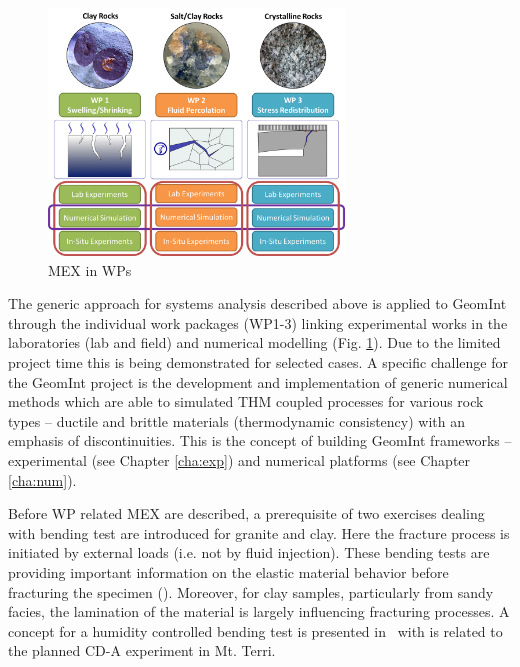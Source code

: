 \begin{figure}
\centering
\includegraphics[width=0.7\textwidth]{figures/geomint-mex-b.png}
\caption{MEX in WPs}
\label{fig:mex-concept-wps}
\end{figure}

The generic approach for systems analysis described above is applied to GeomInt through the individual work packages (WP1-3) linking experimental works in the laboratories (lab and field) and numerical modelling (Fig. \ref{fig:mex-concept-wps}). Due to the limited project time this is being demonstrated for selected cases. A specific challenge for the GeomInt project is the development and implementation of generic numerical methods which are able to simulated THM coupled processes for various rock types – ductile and brittle materials (thermodynamic consistency) with an emphasis of discontinuities. This is the concept of building GeomInt frameworks – experimental (see Chapter \ref{cha:exp}) and numerical platforms (see Chapter \ref{cha:num}).

Before WP related MEX are described, a prerequisite of two exercises dealing with bending test are introduced for granite and clay. Here the fracture process is initiated by external loads (i.e. not by fluid injection). These bending tests are providing important information on the elastic material behavior before fracturing the specimen (\MEXone). Moreover, for clay samples, particularly from sandy facies, the lamination of the material is largely influencing fracturing processes. A concept for a humidity controlled bending test is presented in \MEXthirteen~with is related to the planned CD-A experiment in Mt. Terri.


